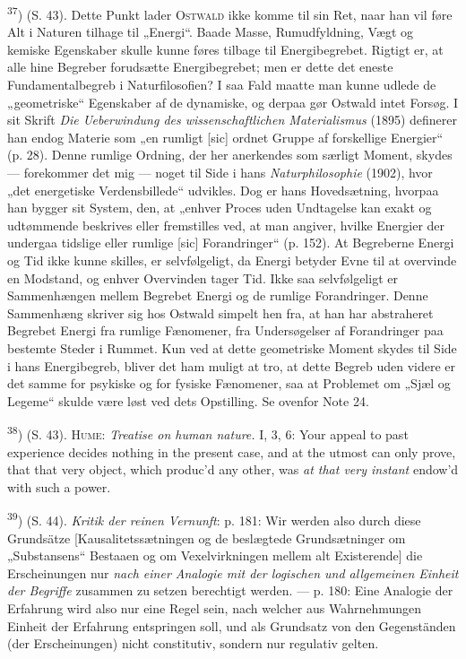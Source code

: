 \documentclass[12pt,a4paper,openany]{book}
\begin{document}
\begin{small}
\textsuperscript{37}) (S. 43). Dette Punkt lader \textsc{Ostwald} ikke komme
til sin Ret, naar han vil føre Alt i Naturen tilhage til „Energi“. Baade Masse,
Rumudfyldning, Vægt og kemiske Egenskaber skulle kunne føres tilbage til
Energibegrebet. Rigtigt er, at alle hine Begreber forudsætte Energibegrebet;
men er dette det eneste Fundamentalbegreb i Naturfilosofien? I saa Fald maatte
man kunne udlede de „geometriske“ Egenskaber af de dynamiske, og derpaa gør
Ostwald intet Forsøg. I sit Skrift \textit{Die Ueberwindung des
wissenschaftlichen Materialismus} (1895) definerer han endog Materie som „en
rumligt [sic] ordnet Gruppe af forskellige Energier“ (p. 28). Denne rumlige
Ordning, der her anerkendes som særligt Moment, skydes --- forekommer det mig
--- noget til Side i hans \textit{Naturphilosophie} (1902), hvor „det
energetiske Verdensbillede“ udvikles. Dog er hans Hovedsætning, hvorpaa han
bygger sit System, den, at „enhver Proces uden Undtagelse kan exakt og
udtømmende beskrives eller fremstilles ved, at man angiver, hvilke Energier der
undergaa tidslige eller rumlige [sic] Forandringer“ (p. 152). At Begreberne
Energi og Tid ikke kunne skilles, er selvfølgeligt, da Energi betyder Evne til
at overvinde en Modstand, og enhver Overvinden tager Tid. Ikke saa
selvfølgeligt er Sammenhængen mellem Begrebet Energi og de rumlige
Forandringer. Denne Sammenhæng skriver sig hos Ostwald simpelt hen fra, at han
har abstraheret Begrebet Energi fra rumlige Fænomener, fra Undersøgelser af
Forandringer paa bestemte Steder i Rummet. Kun ved at dette geometriske Moment
skydes til Side i hans Energibegreb, bliver det ham muligt at tro, at dette
Begreb uden videre er det samme for psykiske og for fysiske Fænomener, saa at
Problemet om „Sjæl og Legeme“ skulde være løst ved dets Opstilling. Se ovenfor
Note 24.

\textsuperscript{38}) (S. 43). \textsc{Hume}: \textit{Treatise on human
nature.} I, 3, 6: Your appeal to past experience decides nothing in the present
case, and at the utmost can only prove, that that very object, which produc'd
any other, was \textit{at that very instant} endow'd with such a power.

\textsuperscript{39}) (S. 44). \textit{Kritik der reinen Vernunft}: p. 181: Wir
werden also durch diese Grundsätze [Kausalitetssætningen og de beslægtede
Grundsætninger om „Substansens“ Bestaaen og om Vexelvirkningen mellem alt
Existerende] die Erscheinungen nur \textit{nach einer Analogie mit der
logischen und allgemeinen Einheit der Begriffe} zusammen zu setzen berechtigt
werden. --- p. 180: Eine Analogie der Erfahrung wird also nur eine Regel sein,
nach welcher aus Wahrnehmungen Einheit der Erfahrung entspringen soll, und als
Grundsatz von den Gegenständen (der Erscheinungen) nicht constitutiv, sondern
nur regulativ gelten.


\end{small}
\end{document}
